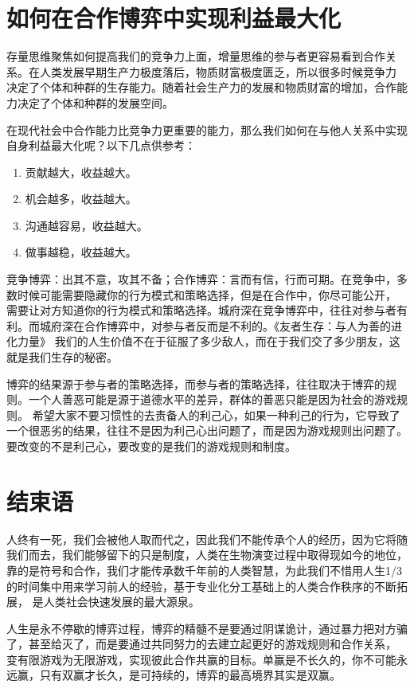 \documentclass[12pt, a4paper]{article} %
\begin{document}
\begin{CJK*}{UTF8}{gbsn}
        \clearpage
        \section{如何在合作博弈中实现利益最大化}
        存量思维聚焦如何提高我们的竞争力上面，增量思维的参与者更容易看到合作关系。在人类发展早期生产力极度落后，物质财富极度匮乏，所以很多时候竞争力
        决定了个体和种群的生存能力。随着社会生产力的发展和物质财富的增加，合作能力决定了个体和种群的发展空间。\par

        在现代社会中合作能力比竞争力更重要的能力，那么我们如何在与他人关系中实现自身利益最大化呢？以下几点供参考：

        \begin{enumerate}
            \item 贡献越大，收益越大。
            \item 机会越多，收益越大。
            \item 沟通越容易，收益越大。
            \item 做事越稳，收益越大。
        \end{enumerate}

        竞争博弈：出其不意，攻其不备；合作博弈：言而有信，行而可期。在竞争中，多数时候可能需要隐藏你的行为模式和策略选择，但是在合作中，你尽可能公开，
        需要让对方知道你的行为模式和策略选择。城府深在竞争博弈中，往往对参与者有利。而城府深在合作博弈中，对参与者反而是不利的。《友者生存：与人为善的进化力量》
        我们的人生价值不在于征服了多少敌人，而在于我们交了多少朋友，这就是我们生存的秘密。\par

        博弈的结果源于参与者的策略选择，而参与者的策略选择，往往取决于博弈的规则。一个人善恶可能是源于道德水平的差异，群体的善恶只能是因为社会的游戏规则。
        希望大家不要习惯性的去责备人的利己心，如果一种利己的行为，它导致了一个很恶劣的结果，往往不是因为利己心出问题了，而是因为游戏规则出问题了。
        要改变的不是利己心，要改变的是我们的游戏规则和制度。

        \clearpage
        \section{结束语}
        人终有一死，我们会被他人取而代之，因此我们不能传承个人的经历，因为它将随我们而去，我们能够留下的只是制度，人类在生物演变过程中取得现如今的地位，
        靠的是符号和合作，我们才能传承数千年前的人类智慧，为此我们不惜用人生1/3的时间集中用来学习前人的经验，基于专业化分工基础上的人类合作秩序的不断拓展，
        是人类社会快速发展的最大源泉。\par

        人生是永不停歇的博弈过程，博弈的精髓不是要通过阴谋诡计，通过暴力把对方骗了，甚至给灭了，而是要通过共同努力的去建立起更好的游戏规则和合作关系，
        变有限游戏为无限游戏，实现彼此合作共赢的目标。单赢是不长久的，你不可能永远赢，只有双赢才长久，是可持续的，博弈的最高境界其实是双赢。



    \end{CJK*}
\end{document}
